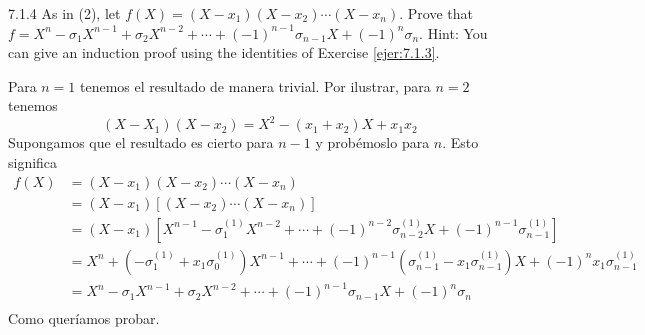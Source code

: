 \documentclass[twoside]{article}
\begin{document}
\begin{ejercicio}{7.1.4}
As in (2), let $f (X) = (X − x_1)(X − x_2) \cdots (X − x_n)$. Prove that $f = X^n − σ_1X^{n−1} +
σ_2X^{n−2} +\cdots+(−1)^{n−1}σ_{n−1}X +(−1)^nσ_n$. Hint: You can give an induction proof using
the identities of Exercise \ref{ejer:7.1.3}.
\end{ejercicio}
\begin{solucion}
Para $n=1$ tenemos el resultado de manera trivial. Por ilustrar, para $n=2$ tenemos
$$
(X-X_1)(X-x_2) = X^2-(x_1+x_2)X+x_1x_2
$$
Supongamos que el resultado es cierto para $n-1$ y probémoslo para $n$. Esto significa
\begin{align*}
f(X)&=(X − x_1)(X − x_2) \cdots (X − x_n)\\
&= (X-x_1)[(X − x_2) \cdots (X − x_n)]\\
&=(X-x_1)[X^{n-1} − σ_1^{(1)}X^{n−2} +\cdots+(−1)^{n−2}σ_{n−2}^{(1)}X +(−1)^{n-1}σ_{n-1}^{(1)}]\\
&=X^n + (-\sigma_1^{(1)} + x_1\sigma_0^{(1)})X^{n-1}+ \cdots +(-1)^{n-1}(\sigma_{n-1}^{(1)}-x_1\sigma_{n-1}^{(1)})X+(-1)^nx_1\sigma_{n-1}^{(1)}\\
&= X^n − σ_1X^{n−1} +σ_2X^{n−2} +\cdots+(−1)^{n−1}σ_{n−1}X +(−1)^nσ_n\\
\end{align*}
Como queríamos probar.
\end{solucion}

\newpage
\end{document}
